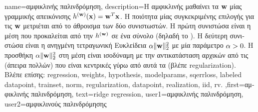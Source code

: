 {name={\foreignlanguage{greek}{αμφικλινής παλινδρόμηση}}, 
	description={\foreignlanguage{greek}{Η αμφικλινής} 
		 \foreignlanguage{greek}{μαθαίνει τα}  ${\bf w}$ \foreignlanguage{greek}{μίας γραμμικής απεικόνισης}  
		 $h^{({\bf w})}({\bf x})= {\bf w}^{T} {\bf x}$. \foreignlanguage{greek}{Η ποιότητα  
		μίας συγκεκριμένης επιλογής για τις}  ${\bf w}$ \foreignlanguage{greek}{μετριέται από το άθροισμα  
		των δύο συνιστωστών. Η πρώτη συνιστώσα είναι η μέση}  
		\foreignlanguage{greek}{που προκαλείται από την $h^{({\bf w})}$ σε ένα σύνολο}
		 \foreignlanguage{greek}{(δηλαδή το} ). \foreignlanguage{greek}{Η δεύτερη συνιστώσα είναι  
		η ανηγμένη τετραγωνική Ευκλείδεια}  $\alpha \| {\bf w} \|^{2}_{2}$ \foreignlanguage{greek}{με μία παράμετρο}   
		$\alpha > 0$. \foreignlanguage{greek}{Η προσθήκη $\alpha \| {\bf w} \|^{2}_{2}$ στη μέση} 
	    	 \foreignlanguage{greek}{είναι ισοδύναμη με την αντικατάσταση αρχικών}  \foreignlanguage{greek}{από τις} 
	    	 \foreignlanguage{greek}{(άπειρα πολλών)}   \foreignlanguage{greek}{που είναι 
		κεντρικές γύρω από αυτά τα}  \foreignlanguage{greek}{(βλέπε} \gls{regularization}).\\
	    \foreignlanguage{greek}{Βλέπε επίσης:} \gls{regression}, \gls{weights}, \gls{hypothesis}, \gls{modelparams}, \gls{sqerrloss}, \gls{labeled datapoint}, \gls{trainset}, \gls{norm}, \gls{regularization}, \gls{datapoint}, \gls{realization}, \gls{iid}, \gls{rv}.
	    },first={\foreignlanguage{greek}{αμφικλινής παλινδρόμηση}},
	    text={ridge regression},
	    user1={\foreignlanguage{greek}{αμφικλινής παλινδρόμηση}}, %
	    user2={\foreignlanguage{greek}{αμφικλινούς παλινδρόμησης}} %
}

